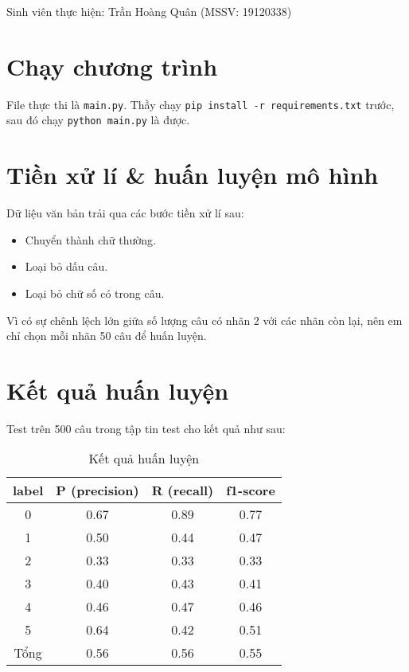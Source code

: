 \documentclass[12pt]{article}
\begin{document}
\noindent Sinh viên thực hiện: Trần Hoàng Quân (MSSV: 19120338)
\section{Chạy chương trình}
File thực thi là \texttt{main.py}. Thầy chạy \texttt{pip install -r requirements.txt} trước, sau đó chạy \texttt{python main.py} là được.
\section{Tiền xử lí \& huấn luyện mô hình}
Dữ liệu văn bản trải qua các bước tiền xử lí sau:
\begin{itemize}
\item Chuyển thành chữ thường.
\item Loại bỏ dấu câu.
\item Loại bỏ chữ số có trong câu.
\end{itemize}
Vì có sự chênh lệch lớn giữa số lượng câu có nhãn 2 với các nhãn còn lại, nên em chỉ chọn mỗi nhãn 50 câu để huấn luyện.

\section{Kết quả huấn luyện}
Test trên 500 câu trong tập tin test cho kết quả như sau:
\begin{table}[H]
\centering
\begin{tabular}{|c|c|c|c|}
\hline
label & P (precision) & R (recall) & f1-score \\
\hline
0 & 0.67 & 0.89 & 0.77 \\
1 & 0.50 & 0.44 & 0.47 \\
2 & 0.33 & 0.33 & 0.33 \\
3 & 0.40 & 0.43 & 0.41 \\
4 & 0.46 & 0.47 & 0.46 \\
5 & 0.64 & 0.42 & 0.51 \\
\hline
Tổng & 0.56 & 0.56 & 0.55 \\
\hline
\end{tabular}
\caption{Kết quả huấn luyện}
\end{table}
\end{document}
